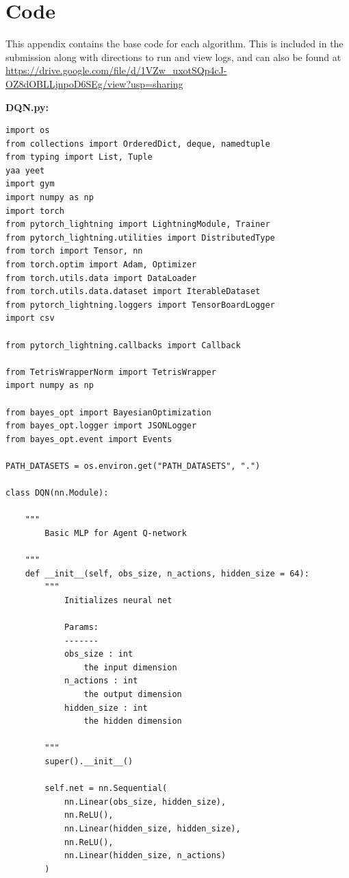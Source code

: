 \documentclass[12pt]{article}
\begin{document}
\section{Code}\label{code}
This appendix contains the base code for each algorithm. This is included in the submission along with directions to run and view logs, and can also be found at \url{https://drive.google.com/file/d/1VZw_uxotSQp4cJ-OZ8dOBLLjnpoD6SEg/view?usp=sharing}\\
\setlength{\columnsep}{1cm}
\begin{addmargin}[-4em]{-4em}%
\begin{multicols}{2}
\textbf{DQN.py:}
\begin{verbatim}
import os
from collections import OrderedDict, deque, namedtuple
from typing import List, Tuple
yaa yeet
import gym
import numpy as np
import torch
from pytorch_lightning import LightningModule, Trainer
from pytorch_lightning.utilities import DistributedType
from torch import Tensor, nn
from torch.optim import Adam, Optimizer
from torch.utils.data import DataLoader
from torch.utils.data.dataset import IterableDataset
from pytorch_lightning.loggers import TensorBoardLogger
import csv

from pytorch_lightning.callbacks import Callback

from TetrisWrapperNorm import TetrisWrapper
import numpy as np

from bayes_opt import BayesianOptimization
from bayes_opt.logger import JSONLogger
from bayes_opt.event import Events

PATH_DATASETS = os.environ.get("PATH_DATASETS", ".")

class DQN(nn.Module):

    """
        Basic MLP for Agent Q-network

    """
    def __init__(self, obs_size, n_actions, hidden_size = 64):
        """
            Initializes neural net

            Params:
            -------
            obs_size : int
                the input dimension
            n_actions : int
                the output dimension
            hidden_size : int
                the hidden dimension

        """
        super().__init__()

        self.net = nn.Sequential(
            nn.Linear(obs_size, hidden_size),
            nn.ReLU(),
            nn.Linear(hidden_size, hidden_size),
            nn.ReLU(),
            nn.Linear(hidden_size, n_actions)
        )


\end{verbatim}
\end{multicols}
\end{addmargin}
\end{document}
